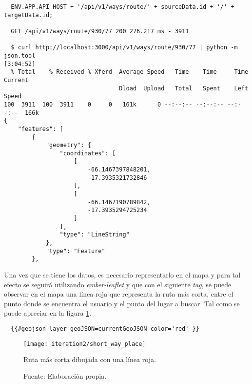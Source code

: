\begin{verbatim}
  ENV.APP.API_HOST + '/api/v1/ways/route/' + sourceData.id + '/' + targetData.id;

  GET /api/v1/ways/route/930/77 200 276.217 ms - 3911

  $ curl http://localhost:3000/api/v1/ways/route/930/77 | python -m json.tool                                                       [3:04:52]
  % Total    % Received % Xferd  Average Speed   Time    Time     Time  Current
                                 Dload  Upload   Total   Spent    Left  Speed
100  3911  100  3911    0     0   161k      0 --:--:-- --:--:-- --:--:--  166k
{
    "features": [
        {
            "geometry": {
                "coordinates": [
                    [
                        -66.1467397848201,
                        -17.3935321732846
                    ],
                    [
                        -66.1467190789842,
                        -17.3935294725234
                    ]
                ],
                "type": "LineString"
            },
            "type": "Feature"
        },

\end{verbatim}

Una vez que se tiene los datos, es necesario representarlo en el mapa y para tal efecto se seguirá utilizando \emph{ember-leaflet} y que con el siguiente \emph{tag}, se puede observar en el mapa una línea roja que representa la ruta más corta,  entre el punto donde se encuentra el usuario y el punto del lugar a buscar. Tal como se puede apreciar en la figura \ref{fig:short_way_place}.
%
\begin{verbatim}
  {{#geojson-layer geoJSON=currentGeoJSON color='red' }}
\end{verbatim}


\begin{figure}[H]
  \begin{center}
    \texttt{[image: iteration2/short\_way\_place]}
    \caption{Ruta más corta dibujada con una línea roja.}
    \label{fig:short_way_place}
    \caption*{Fuente: Elaboración propia.}
  \end{center}
\end{figure}



